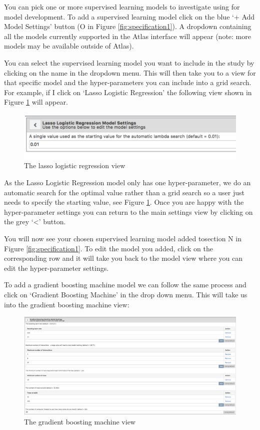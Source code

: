 \documentclass[11pt]{book}
\theoremstyle{definition}
\theoremstyle{definition}
\theoremstyle{definition}
\theoremstyle{remark}
\begin{document}
You can pick one or more supervised learning models to investigate using for model development. To add a supervised learning model click on the blue `+ Add Model Settings' button (O in Figure \ref{fig:specification1}). A dropdown containing all the models currently supported in the Atlas interface will appear (note: more models may be available outside of Atlas).

You can select the supervised learning model you want to include in the study by clicking on the name in the dropdown menu. This will then take you to a view for that specific model and the hyper-parameters you can include into a grid search. For example, if I click on `Lasso Logistic Regression' the following view shown in Figure \ref{fig:figureAS2} will appear.

\begin{figure}
\includegraphics[width=1\linewidth]{images/PatientLevelPrediction/atlasImplementation/analysis_lasso_lr_view} \caption{The lasso logistic regression view}\label{fig:figureAS2}
\end{figure}

As the Lasso Logistic Regression model only has one hyper-parameter, we do an automatic search for the optimal value rather than a grid search so a user just needs to specify the starting value, see Figure \ref{fig:figureAS2}. Once you are happy with the hyper-parameter settings you can return to the main settings view by clicking on the grey `\textless{}' button.

You will now see your chosen supervised learning model added tosection N in Figure \ref{fig:specification1}. To edit the model you added, click on the corresponding row and it will take you back to the model view where you can edit the hyper-parameter settings.

To add a gradient boosting machine model we can follow the same process and click on `Gradient Boosting Machine' in the drop down menu. This will take us into the gradient boosting machine view:

\begin{figure}
\includegraphics[width=1\linewidth]{images/PatientLevelPrediction/atlasImplementation/analysis_gbm_view} \caption{The gradient boosting machine view}\label{fig:figureAS5}
\end{figure}
\end{document}
